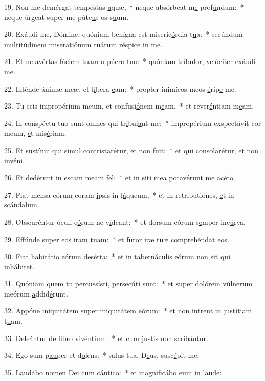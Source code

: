 19. Non me demérgat tempéstas \uline{a}quæ,~† neque absórbeat m\uline{e} prof\uline{ú}ndum:~* neque úrgeat super me púte\uline{u}s os s\uline{u}um.\par 
20. Exáudi me, Dómine, quóniam benígna est miseric\uline{ó}rdia t\uline{u}a:~* secúndum multitúdinem miseratiónum tuárum r\uline{é}spice \uline{i}n me.\par 
21. Et ne avértas fáciem tuam a p\uline{ú}ero t\uline{u}o:~* quóniam tríbulor, velócit\uline{e}r ex\uline{áu}di me.\par 
22. Inténde ánimæ meæ, et l\uline{í}bera \uline{e}am:~* propter inimícos meos \uline{é}rip\uline{e} me.\par 
23. Tu scis impropérium meum, et confusi\uline{ó}nem m\uline{e}am,~* et rever\uline{é}ntiam m\uline{e}am.\par 
24. In conspéctu tuo sunt omnes qui tr\uline{í}bul\uline{a}nt me:~* impropérium exspectávit cor meum, \uline{e}t mis\uline{é}riam.\par 
25. Et sustínui qui simul contristarétur, \uline{e}t non f\uline{u}it:~* et qui consolarétur, et n\uline{o}n inv\uline{é}ni.\par 
26. Et dedérunt in \uline{e}scam m\uline{e}am fel:~* et in siti mea potavérunt m\uline{e} ac\uline{é}to.\par 
27. Fiat mensa eórum coram \uline{i}psis in l\uline{á}queum,~* et in retributiónes, \uline{e}t in sc\uline{á}ndalum.\par 
28. Obscuréntur óculi e\uline{ó}rum ne v\uline{í}deant:~* et dorsum eórum s\uline{e}mper inc\uline{ú}rva.\par 
29. Effúnde super eos \uline{i}ram t\uline{u}am:~* et furor iræ tuæ compreh\uline{é}ndat \uline{e}os.\par 
30. Fiat habitátio e\uline{ó}rum des\uline{é}rta:~* et in tabernáculis eórum non sit \uline{qui} inh\uline{á}bitet.\par 
31. Quóniam quem tu percussísti, p\uline{e}rsec\uline{ú}ti sunt:~* et super dolórem vúlnerum meórum \uline{a}ddid\uline{é}runt.\par 
32. Appóne iniquitátem super iniquit\uline{á}tem e\uline{ó}rum:~* et non intrent in just\uline{í}tiam t\uline{u}am.\par 
33. Deleántur de l\uline{i}bro viv\uline{é}ntium:~* et cum justis n\uline{o}n scrib\uline{á}ntur.\par 
34. Ego sum p\uline{au}per et d\uline{o}lens:~* salus tua, D\uline{e}us, susc\uline{é}pit me.\par 
35. Laudábo nomen D\uline{e}i cum c\uline{á}ntico:~* et magnificábo \uline{e}um in l\uline{au}de:\par 
